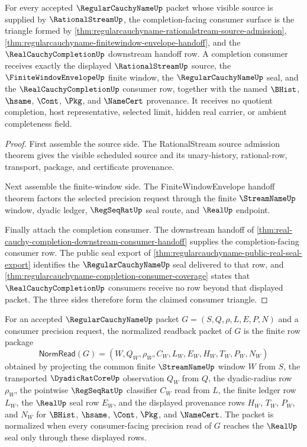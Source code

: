 \begin{theorem}
\label{thm:regularcauchyname-real-cauchy-completion-consumer-triangle}
For every accepted $\RegularCauchyNameUp$ packet whose visible source is supplied by $\RationalStreamUp$, the completion-facing consumer surface is the triangle formed by \autoref{thm:regularcauchyname-rationalstream-source-admission}, \autoref{thm:regularcauchyname-finitewindow-envelope-handoff}, and the $\RealCauchyCompletionUp$ downstream handoff row. A completion consumer receives exactly the displayed $\RationalStreamUp$ source, the $\FiniteWindowEnvelopeUp$ finite window, the $\RegularCauchyNameUp$ seal, and the $\RealCauchyCompletionUp$ consumer row, together with the named $\BHist$, $\hsame$, $\Cont$, $\Pkg$, and $\NameCert$ provenance. It receives no quotient completion, host representative, selected limit, hidden real carrier, or ambient completeness field.
\end{theorem}
\begin{proof}
First assemble the source side. The RationalStream source admission theorem gives the visible scheduled source and its unary-history, rational-row, transport, package, and certificate provenance.

Next assemble the finite-window side. The FiniteWindowEnvelope handoff theorem factors the selected precision request through the finite $\StreamNameUp$ window, dyadic ledger, $\RegSeqRatUp$ seal route, and $\RealUp$ endpoint.

Finally attach the completion consumer. The downstream handoff of \autoref{thm:real-cauchy-completion-downstream-consumer-handoff} supplies the completion-facing consumer row. The public seal export of \autoref{thm:regularcauchyname-public-real-seal-export} identifies the $\RegularCauchyNameUp$ seal delivered to that row, and \autoref{thm:regularcauchyname-completion-consumer-coverage} states that $\RealCauchyCompletionUp$ consumers receive no row beyond that displayed packet. The three sides therefore form the claimed consumer triangle.
\end{proof}

\begin{definition}
\label{def:regularcauchyname-normalized-window-readback}
For an accepted $\RegularCauchyNameUp$ packet $G=(S,Q,\rho,L,E,P,N)$ and a consumer precision request, the normalized readback packet of $G$ is the finite row package
$$
\mathsf{NormRead}(G)=(W,Q_W,\rho_W,C_W,L_W,E_W,H_W,T_W,P_W,N_W)
$$
obtained by projecting the common finite $\StreamNameUp$ window $W$ from $S$, the transported $\DyadicRatCoreUp$ observation $Q_W$ from $Q$, the dyadic-radius row $\rho_W$, the pointwise $\RegSeqRatUp$ classifier $C_W$ read from $L$, the finite ledger row $L_W$, the $\RealUp$ seal row $E_W$, and the displayed provenance rows $H_W$, $T_W$, $P_W$, and $N_W$ for $\BHist$, $\hsame$, $\Cont$, $\Pkg$, and $\NameCert$. The packet is normalized when every consumer-facing precision read of $G$ reaches the $\RealUp$ seal only through these displayed rows.
\end{definition}

